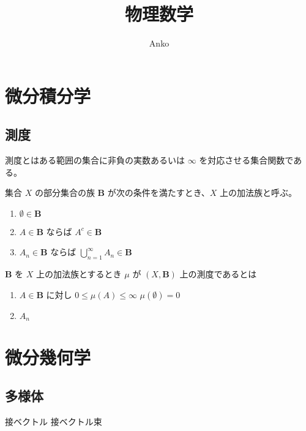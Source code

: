 \documentclass[uplatex,dvipdfmx,a4paper,11pt]{jlreq}
\title{物理数学}
\author{Anko}
\theoremstyle{definition}
\begin{document}
\maketitle


\section{微分積分学}
\subsection{測度}
測度とはある範囲の集合に非負の実数あるいは $\infty$ を対応させる集合関数である。
\begin{definition}[加法族]
  集合 $X$ の部分集合の族 $\bm{B}$ が次の条件を満たすとき、$X$ 上の加法族と呼ぶ。
  \begin{enumerate}
    \item $\emptyset\in\bm{B}$
    \item $A\in\bm{B}$ ならば $A^c\in\bm{B}$
    \item $A_n\in\bm{B}$ ならば $\bigcup_{n=1}^\infty A_n\in\bm{B}$
  \end{enumerate}
\end{definition}
\begin{definition}[測度]
  $\bm{B}$ を $X$ 上の加法族とするとき $\mu$ が $(X, \bm{B})$ 上の測度であるとは
  \begin{enumerate}
    \item $A\in\bm{B}$ に対し $0\leq \mu(A)\leq\infty$ $\mu(\emptyset) = 0$
    \item $A_n$
  \end{enumerate}
\end{definition}

\section{微分幾何学}
\subsection{多様体}
接ベクトル
接ベクトル束
\end{document}
